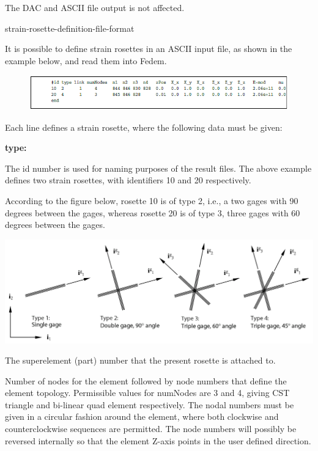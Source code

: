 {The DAC and ASCII file output is not affected.

\clearpage


           {strain-rosette-definition-file-format}

It is possible to define strain rosettes in an ASCII input file, as
shown in the example below, and read them into Fedem.

\begin{figure}[!h]
  \includegraphics[width=\textwidth]{Figures/6_StrainRosette_file_format}
\end{figure}

Each line defines a strain rosette, where the following data must be given:
%
\begin{namelist}{\bf type:}
\item[\sl\textbf{id:}]
  The id number is used for naming purposes of the result files.
  The above example defines two strain rosettes,
  with identifiers 10 and 20 respectively.

\item[\sl\textbf{type:}]
  According to the figure below, rosette 10 is of type 2, i.e., a two gages
  with 90 degrees between the gages, whereas rosette 20 is of type 3,
  three gages with 60 degrees between the gages.

  \hspace*{-0.33\textwidth}
  \includegraphics[width=1.2\textwidth]{Figures/6-StrainGages}

\item[\sl\textbf{link:}]
  The superelement (part) number that the present rosette is attached to.

\item[\sl\textbf{numNodes n1 n2 n3 (n4):}]
  Number of nodes for the element followed by node numbers that define the
  element topology. Permissible values for numNodes are 3 and 4,
  giving CST triangle and bi-linear quad element respectively.
  The nodal numbers must be given in a circular fashion around the element,
  where both clockwise and counterclockwise sequences are permitted.
  The node numbers will possibly be reversed internally so that the element
  Z-axis points in the user defined direction.


\end{namelist}}
